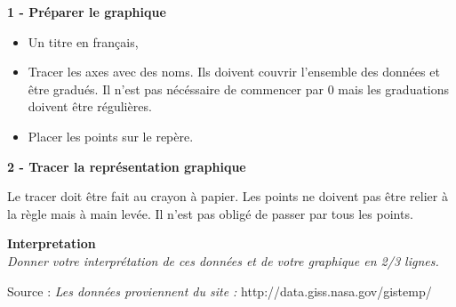 \documentclass[10pt]{article}
\newcommand{\Pointille}[1][3]{\multido{}{#1}{ \makebox[\linewidth]{\dotfill}\\[\parskip]}}
\begin{document}
\begin{multicols}{2}


  \textbf{1 - Préparer le graphique}

  \begin{itemize}
  \item Un titre en français, 
  \item Tracer les axes avec des noms. Ils doivent couvrir l'ensemble des données et être gradués. Il n'est pas nécéssaire de commencer  par 0  mais les graduations doivent être régulières.
  \item Placer les points sur le repère.
  \end{itemize}

  \textbf{2 - Tracer la représentation graphique}

  Le tracer doit être fait au crayon à papier. Les points ne doivent pas être relier à la règle mais à main levée. Il n'est pas obligé de passer par tous les points.

\end{multicols}

\noindent\hrulefill

\textbf{Interpretation}\\

\textit{Donner votre interprétation de ces données et de votre graphique en 2/3 lignes.}\\

\Pointille[4]

Source : \textit{Les données proviennent du site :} http://data.giss.nasa.gov/gistemp/ \\
\end{document}
